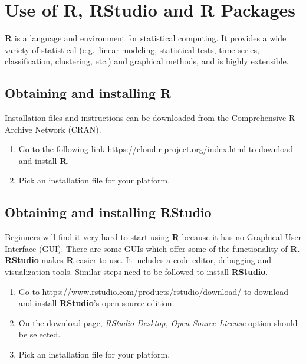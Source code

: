 \documentclass[
  10pt,
  b5paper,
  oneside]{book}
\providecommand{\tightlist}{%
  \setlength{\itemsep}{0pt}\setlength{\parskip}{0pt}}
\theoremstyle{definition}
\theoremstyle{definition}
\theoremstyle{definition}
\theoremstyle{definition}
\theoremstyle{remark}
\begin{document}
\hypertarget{use-of-r-rstudio-and-r-packages}{%
\section{Use of R, RStudio and R Packages}\label{use-of-r-rstudio-and-r-packages}}

\textbf{R} is a language and environment for statistical computing. It provides a wide variety of statistical (e.g.~linear modeling, statistical tests, time-series, classification, clustering, etc.) and graphical methods, and is highly extensible.

\hypertarget{obtaining-and-installing-r}{%
\subsection{Obtaining and installing R}\label{obtaining-and-installing-r}}

Installation files and instructions can be downloaded from the Comprehensive R Archive Network (CRAN).

\begin{enumerate}
\def\labelenumi{\arabic{enumi}.}
\tightlist
\item
  Go to the following link \url{https://cloud.r-project.org/index.html} to download and install \textbf{R}.
\item
  Pick an installation file for your platform.
\end{enumerate}

\hypertarget{obtaining-and-installing-rstudio}{%
\subsection{Obtaining and installing RStudio}\label{obtaining-and-installing-rstudio}}

Beginners will find it very hard to start using \textbf{R} because it has no Graphical User Interface (GUI). There are some GUIs which offer some of the functionality of \textbf{R}. \textbf{RStudio} makes \textbf{R} easier to use. It includes a code editor, debugging and visualization tools. Similar steps need to be followed to install \textbf{RStudio}.

\begin{enumerate}
\def\labelenumi{\arabic{enumi}.}
\tightlist
\item
  Go to \url{https://www.rstudio.com/products/rstudio/download/} to download and install \textbf{RStudio}'s open source edition.
\item
  On the download page, \emph{RStudio Desktop, Open Source License} option should be selected.
\item
  Pick an installation file for your platform.
\end{enumerate}
\end{document}
